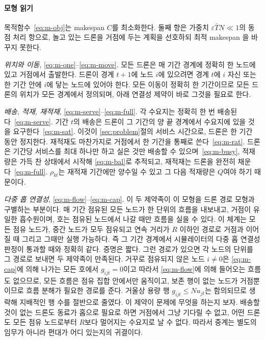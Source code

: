 \documentclass[final,5p,times,twocolumn]{elsarticle}
\begin{document}
\paragraph{모형 읽기}
목적함수~\eqref{eq:m-obj}는 makespan $C$를 최소화한다. 둘째 항은 가중치 $\varepsilon \bar T N
\ll 1$의 동점 처리 항으로, 놀고 있는 드론을 거점에 두는 계획을 선호하되 최적 makespan 을 바꾸지
못한다.

\emph{위치와 이동}, \eqref{eq:m-one}--\eqref{eq:m-move}. 모든 드론은 매 기간 경계에 정확히 한
노드에 있고 거점에서 출발한다. 드론이 경계 $t+1$에 노드 $i$에 있으려면 경계 $t$에 $i$ 자신 또는
한 기간 안에 $i$에 닿는 노드에 있어야 한다. 모든 이동이 정확히 한 기간이므로 모든 드론의 위치가
모든 경계에서 정의되며, 아래 연결성 제약이 바로 그것을 필요로 한다.

\emph{배송, 적재, 재적재}, \eqref{eq:m-serve}--\eqref{eq:m-full}. 각 수요지는 정확히 한 번
배송된다~\eqref{eq:m-serve}. 기간 $t$의 배송은 드론이 그 기간의 양 끝 경계에서 수요지에 있을 것을
요구한다~\eqref{eq:m-sat}. 이것이 \ref{sec:problem}절의 서비스 시간으로, 드론은 한 기간 동안
정지한다. 재적재도 마찬가지로 거점에서 한 기간을 통째로 쓴다~\eqref{eq:m-rat}. 드론은 기간당
서비스를 최대 하나만 하고 실은 것만 배송할 수 있으며~\eqref{eq:m-busy}, 적재량은 가득 찬 상태에서
시작해 \eqref{eq:m-bal}로 추적되고, 재적재는 드론을 완전히 채운다~\eqref{eq:m-full}.
$\rho_{kt}$는 재적재 기간에만 양수일 수 있고 그 다음 적재량은 $Q$여야 하기 때문이다.

\emph{다중 홉 연결성}, \eqref{eq:m-flow}--\eqref{eq:m-cap}. 이 두 제약족이 이 모형을 드론 경로
모형과 구별하는 부분이다. 매 기간 점유된 모든 노드가 한 단위의 흐름을 내보내고, 거점이 유일한
흡수원이며, 호는 점유된 노드에서 나갈 때만 흐름을 실을 수 있다. 이 체계는 모든 점유 노드가, 중간
노드가 모두 점유되고 연속 거리가 $R$ 이하인 경로로 거점과 이어질 때 그리고 그때만 실행 가능하다.
즉 그 기간 경계에서 시뮬레이터의 다중 홉 연결성 판정이 통과할 때와 정확히 같다. 증명은 짧다. 그런
경로가 있으면 각 노드의 단위를 그 경로로 보내면 두 제약족이 만족된다. 거꾸로 점유되지 않은 노드
$i \ne 0$은 \eqref{eq:m-cap}에 의해 나가는 모든 호에서 $g_{ijt} = 0$이고 따라서
\eqref{eq:m-flow}에 의해 들어오는 흐름도 없으므로, 모든 흐름은 점유 집합 안에서만 움직이고, 보존
행이 없는 노드가 거점뿐이므로 흐름 분해가 필요한 경로를 준다. 거울상 용량 행 $g_{ijt} \le N
u_{jt}$는 함의되므로 생략해 지배적인 행 수를 절반으로 줄였다. 이 제약이 문제에 무엇을 하는지
보자. 배송할 것이 없는 드론도 동료가 홉으로 필요로 하면 거점에서 그냥 기다릴 수 없고, 어떤 드론도
모든 점유 노드로부터 $R$보다 멀어지는 수요지로 날 수 없다. 따라서 중계는 별도의 임무가 아니라
편대가 어디 있는지의 귀결이다.
\end{document}
